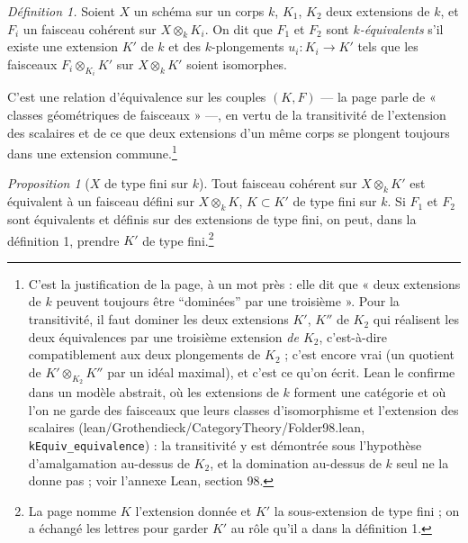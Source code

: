 \documentclass[11pt,a4paper]{article}
\begin{document}
\emph{Définition 1.} Soient $X$ un schéma sur un corps $k$, $K_1$, $K_2$ deux
extensions de $k$, et $F_i$ un faisceau cohérent sur $X \otimes_k K_i$. On
dit que $F_1$ et $F_2$ sont \emph{$k$-équivalents} s'il existe une
extension $K'$ de $k$ et des $k$-plongements $u_i : K_i \to K'$ tels que les
faisceaux $F_i \otimes_{K_i} K'$ sur $X \otimes_k K'$ soient isomorphes.

C'est une relation d'équivalence sur les couples $(K, F)$ --- la page
parle de « classes géométriques de faisceaux » ---, en vertu de la
transitivité de l'extension des scalaires et de ce que deux extensions d'un
même corps se plongent toujours dans une extension commune.\footnote{C'est
la justification de la page, à un mot près : elle dit que « deux extensions
de $k$ peuvent toujours être “dominées” par une troisième ». Pour la
transitivité, il faut dominer les deux extensions $K'$, $K''$ de $K_2$ qui
réalisent les deux équivalences par une troisième extension \emph{de
$K_2$}, c'est-à-dire compatiblement aux deux plongements de $K_2$ ; c'est
encore vrai (un quotient de $K' \otimes_{K_2} K''$ par un idéal maximal),
et c'est ce qu'on écrit. Lean le confirme dans un modèle abstrait, où les
extensions de $k$ forment une catégorie et où l'on ne garde des faisceaux
que leurs classes d'isomorphisme et l'extension des scalaires
(lean/Grothendieck/CategoryTheory/Folder98.lean, \texttt{kEquiv\_equivalence}) : la
transitivité y est démontrée sous l'hypothèse d'amalgamation au-dessus de
$K_2$, et la domination au-dessus de $k$ seul ne la donne pas ; voir
l'annexe Lean, section 98.}

\emph{Proposition 1} ($X$ de type fini sur $k$). Tout faisceau cohérent sur
$X \otimes_k K'$ est équivalent à un faisceau défini sur
$X \otimes_k K$, $K \subset K'$ de type fini sur $k$. Si $F_1$ et $F_2$ sont
équivalents et définis sur des extensions de type fini, on peut, dans la
définition 1, prendre $K'$ de type fini.\footnote{La page nomme $K$
l'extension donnée et $K'$ la sous-extension de type fini ; on a échangé
les lettres pour garder $K'$ au rôle qu'il a dans la définition 1.}
\end{document}
